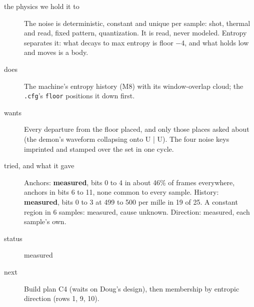 \begin{description}
\item[{the physics we hold it to}] The noise is deterministic, constant and unique per sample: shot, thermal and read, fixed pattern, quantization. It is read, never modeled. Entropy separates it: what decays to max entropy is floor −4, and what holds low and moves is a body.
\item[{does}] The machine's entropy history (M8) with its window-overlap cloud; the \texttt{.\allowbreak{}cfg}'s \texttt{floor} positions it down first.
\item[{wants}] Every departure from the floor placed, and only those places asked about (the demon's waveform collapsing onto U | U). The four noise keys imprinted and stamped over the set in one cycle.
\item[{tried, and what it gave}] Anchors: \textbf{measured}, bits 0 to 4 in about 46\% of frames everywhere, anchors in bits 6 to 11, none common to every sample. History: \textbf{measured}, bits 0 to 3 at 499 to 500 per mille in 19 of 25. A constant region in 6 samples: measured, cause unknown. Direction: measured, each sample's own.
\item[{status}] measured
\item[{next}] Build plan C4 (waits on Doug's design), then membership by entropic direction (rows 1, 9, 10).
\end{description}

